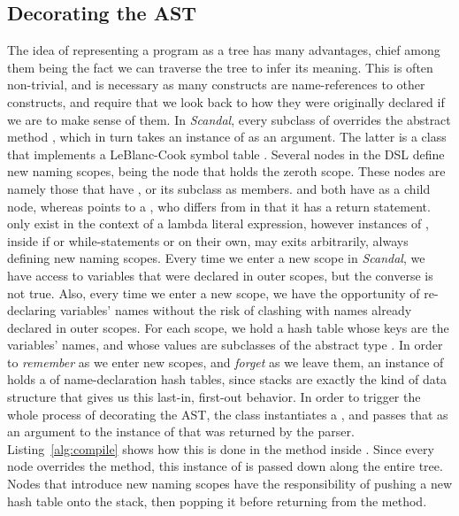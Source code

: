 \subsection{Decorating the AST}

The idea of representing a program as a tree has many advantages, chief among them being the fact we can traverse the tree to infer its meaning. This is often non-trivial, and is necessary as many constructs are name-references to other constructs, and require that we look back to how they were originally declared if we are to make sense of them. In \emph{Scandal}, every subclass of  overrides the abstract method , which in turn takes an instance of  as an argument. The latter is a class that implements a LeBlanc-Cook symbol table \cite{Cook1983}. Several nodes in the DSL define new naming scopes,  being the node that holds the zeroth scope. These nodes are namely those that have , or its subclass  as members.  and  both have  as a child node, whereas  points to a , who differs from  in that it has a return statement.  only exist in the context of a lambda literal expression, however instances of , inside if or while-statements or on their own, may exits arbitrarily, always defining new naming scopes. Every time we enter a new scope in \emph{Scandal}, we have access to variables that were declared in outer scopes, but the converse is not true. Also, every time we enter a new scope, we have the opportunity of re-declaring variables' names without the risk of clashing with names already declared in outer scopes. For each scope, we hold a hash table whose keys are the variables' names, and whose values are subclasses of the abstract type . In order to \emph{remember} as we enter new scopes, and \emph{forget} as we leave them, an instance of  holds a  of name-declaration hash tables, since stacks are exactly the kind of data structure that gives us this last-in, first-out behavior. In order to trigger the whole process of decorating the AST, the  class instantiates a , and passes that as an argument to the instance of  that was returned by the parser. Listing~\ref{alg:compile} shows how this is done in the  method inside . Since every node overrides the  method, this instance of  is passed down along the entire tree. Nodes that introduce new naming scopes have the responsibility of pushing a new hash table onto the stack, then popping it before returning from the  method.

